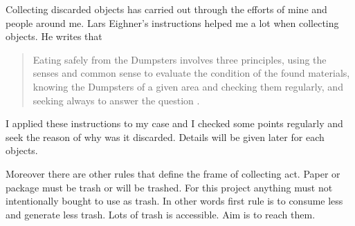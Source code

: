 






Collecting discarded objects has carried out through the efforts of mine and people around me. Lars Eighner's instructions helped me a lot when collecting objects. He writes that 
\begin{singlespace}
\begin{quote}
Eating safely from the Dumpsters involves three principles, using the senses and common sense to evaluate the condition of the found materials, knowing the Dumpsters of a given area and checking them regularly, and seeking always to answer the question  \citep[as cited in][6]{strasser1999waste}.
\end{quote}
\end{singlespace}
I applied these instructions to my case and I checked some points regularly and seek the reason of why was it discarded. Details will be given later for each objects. 



Moreover there are other rules that define the frame of collecting act. Paper or package must be trash or will be trashed. For this project anything must not intentionally bought to use as trash. In other words first rule is to consume less and generate less trash. Lots of trash is accessible. Aim is to reach them.

